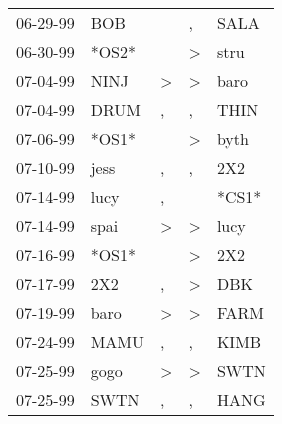 \begin{supertabular}{p{0.07\textwidth}p{0.06\textwidth}p{0.02\textwidth}p{0.02\textwidth}p{0.06\textwidth}}
          06-29-99\textsuperscript{} &            BOB\textsuperscript{} &                  &                , &           SALA\textsuperscript{} \\
          06-30-99\textsuperscript{} &                            *OS2* &                  &     \textgreater &           stru\textsuperscript{} \\
          07-04-99\textsuperscript{} &           NINJ\textsuperscript{} &     \textgreater &     \textgreater &           baro\textsuperscript{} \\
          07-04-99\textsuperscript{} &           DRUM\textsuperscript{} &                , &                , &           THIN\textsuperscript{} \\
          07-06-99\textsuperscript{} &                            *OS1* &                  &     \textgreater &           byth\textsuperscript{} \\
          07-10-99\textsuperscript{} &           jess\textsuperscript{} &                , &                , &            2X2\textsuperscript{} \\
          07-14-99\textsuperscript{} &           lucy\textsuperscript{} &                , &                  &                            *CS1* \\
          07-14-99\textsuperscript{} &           spai\textsuperscript{} &     \textgreater &     \textgreater &           lucy\textsuperscript{} \\
          07-16-99\textsuperscript{} &                            *OS1* &                  &     \textgreater &            2X2\textsuperscript{} \\
          07-17-99\textsuperscript{} &            2X2\textsuperscript{} &                , &     \textgreater &            DBK\textsuperscript{} \\
          07-19-99\textsuperscript{} &           baro\textsuperscript{} &     \textgreater &     \textgreater &           FARM\textsuperscript{} \\
          07-24-99\textsuperscript{} &           MAMU\textsuperscript{} &                , &                , &           KIMB\textsuperscript{} \\
          07-25-99\textsuperscript{} &           gogo\textsuperscript{} &     \textgreater &     \textgreater &           SWTN\textsuperscript{} \\
          07-25-99\textsuperscript{} &           SWTN\textsuperscript{} &                , &                , &           HANG\textsuperscript{} \\

\end{supertabular}
